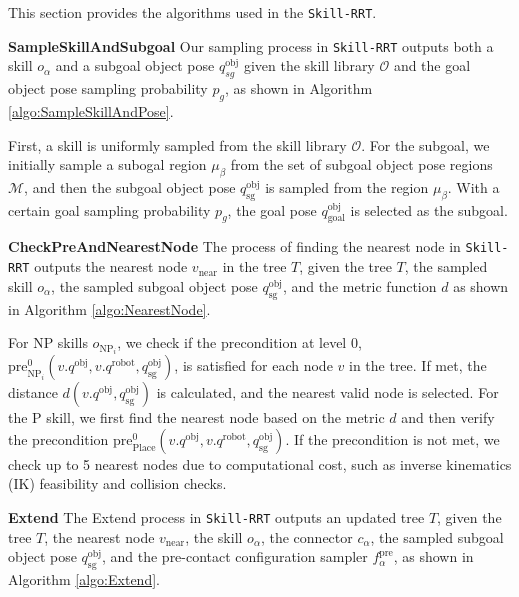 This section provides the algorithms used in the \texttt{Skill-RRT}.

\textbf{SampleSkillAndSubgoal} Our sampling process in \texttt{Skill-RRT} outputs both a skill $o_\alpha$ and a subgoal object pose $q^{\text{obj}}_{sg}$ given the skill library \( \mathcal{O} \) and the goal object pose sampling probability \( p_g \), as shown in Algorithm \ref{algo:SampleSkillAndPose}.

First, a skill is uniformly sampled from the skill library \( \mathcal{O} \). For the subgoal, we initially sample a subogal region \( \mu_{\beta} \) from the set of subgoal object pose regions \( \mathcal{M} \), and then the subgoal object pose \( q^{\text{obj}}_{\text{sg}} \) is sampled from the region \( \mu_{\beta} \). With a certain goal sampling probability \( p_g \), the goal pose \( q^{\text{obj}}_{\text{goal}} \) is selected as the subgoal.


\textbf{CheckPreAndNearestNode} The process of finding the nearest node in \texttt{Skill-RRT} outputs the nearest node \( v_{\text{near}} \) in the tree \( T \), given the tree \( T \), the sampled skill \( o_\alpha \), the sampled subgoal object pose \( q^{\text{obj}}_{\text{sg}} \), and the metric function \( d \) as shown in Algorithm \ref{algo:NearestNode}.

For NP skills \( o_{{\text{NP}_i}} \), we check if the precondition at level 0, \( \mathrm{pre}^{0}_{\text{NP}_i}(v.q^{\text{obj}}, v.q^{\text{robot}}, q^{\text{obj}}_{\text{sg}}) \), is satisfied for each node \( v \) in the tree. If met, the distance \( d(v.q^{\text{obj}}, q^{\text{obj}}_{\text{sg}}) \) is calculated, and the nearest valid node is selected. For the P skill, we first find the nearest node based on the metric \( d \) and then verify the precondition \( \mathrm{pre}^{0}_{\text{Place}}(v.q^{\text{obj}}, v.q^{\text{robot}}, q^{\text{obj}}_{\text{sg}}) \). If the precondition is not met, we check up to 5 nearest nodes due to computational cost, such as inverse kinematics (IK) feasibility and collision checks.





\textbf{Extend} The Extend process in \texttt{Skill-RRT} outputs an updated tree \( T \), given the tree \( T \), the nearest node \( v_{\text{near}} \), the skill \( o_\alpha \), the connector \( c_\alpha \), the sampled subgoal object pose \( q^{\text{obj}}_{\text{sg}} \), and the pre-contact configuration sampler \( f^\text{pre}_\alpha \), as shown in Algorithm \ref{algo:Extend}.

